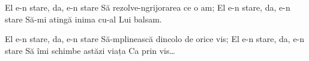\beginverse
El e-n stare, da, e-n stare
Să rezolve-ngrijorarea ce o am;
El e-n stare, da, e-n stare
Să-mi atingă inima cu-al Lui balsam.
\endverse

\beginchorus
El e-n stare, da, e-n stare
Să-mplinească dincolo de orice vis;
El e-n stare, da, e-n stare
Să îmi schimbe astăzi viața
Ca prin vis…
\endchorus
\endsong
